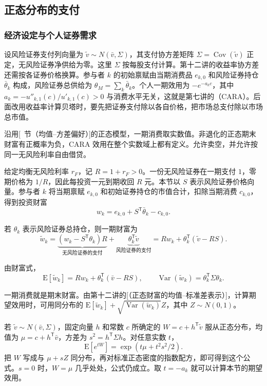 \subsection{正态分布的支付}
\subsubsection{经济设定与个人证券需求}
设风险证券支付列向量为 $\widetilde v\sim N(\bar v,\Sigma)$，其支付协方差矩阵 $\Sigma=\operatorname{Cov}(\widetilde v)$ 正定，无风险证券净供给为零。这里 $\Sigma$ 按每股支付计算。第十二讲的收益率协方差还需按各证券价格换算。参与者 $k$ 的初始禀赋由当期消费品 $e_{k,0}$ 和风险证券持仓 $\bar\theta_k$ 构成，风险证券总供给为 $\theta_M=\sum_k\bar\theta_k$。个人一期效用为 $-e^{-a_kc}$，其中 $a_k=-u''_{k,1}(c)/u'_{k,1}(c)>0$ 与消费水平无关，这就是第七讲的\mbox{}（CARA）。后面改用收益率计算贝塔时，要先把证券支付除以各自价格，把市场总支付除以市场总市值。

沿用[~节（均值--方差偏好）]的正态模型，一期消费取实数值。非退化的正态期末财富有正概率为负，CARA 效用在整个实数域上都有定义。允许卖空，并允许按同一无风险利率自由借贷。

给定均衡无风险利率 $r_F$，记 $R=1+r_F>0$。一份无风险证券在一期支付 $1$，零期价格为 $1/R$，因此每投资一元到期收回 $R$ 元。本节以 $S$ 表示风险证券价格向量。参与者 $k$ 将当期禀赋 $e_{k,0}$ 和初始证券持仓的市值合计，扣除当期消费 $c_{k,0}$，得到投资财富
\[
 w_k=e_{k,0}+S^{\mathsf T}\bar\theta_k-c_{k,0}.
\]

若 $\theta_k$ 表示风险证券总持仓，则一期财富为
\[
 \widetilde w_k=\underbrace{(w_k-S^{\mathsf T}\theta_k)R}_{\text{无风险证券的支付}}
 +\underbrace{\theta_k^{\mathsf T}\widetilde v}_{\text{风险证券的支付}}
 =Rw_k+\theta_k^{\mathsf T}(\widetilde v-RS).
\]

由财富式，
\[
 \mathrm E[\widetilde w_k]=Rw_k+\theta_k^{\mathsf T}(\bar v-RS),\qquad
 \operatorname{Var}(\widetilde w_k)=\theta_k^{\mathsf T}\Sigma\theta_k.
\]

一期消费就是期末财富。由第十二讲的[（正态财富的均值--标准差表示）]，计算期望效用时，可用同分布的 $\mathrm E[\widetilde w_k]+\sqrt{\operatorname{Var}(\widetilde w_k)}Z$，其中 $Z\sim N(0,1)$。

\begin{tcolorbox}[knowledge,title={联合正态的线性组合与正态指数矩}]
若 $\widetilde v\sim N(\bar v,\Sigma)$，固定向量 $h$ 和常数 $c$ 所确定的 $W=c+h^{\mathsf T}\widetilde v$ 服从正态分布，均值为 $\mu=c+h^{\mathsf T}\bar v$，方差为 $s^2=h^{\mathsf T}\Sigma h$。对任意实数 $t$，
\[
 \mathrm E[e^{tW}]=\exp(t\mu+t^2s^2/2).
\]
把 $W$ 写成与 $\mu+sZ$ 同分布，再对标准正态密度的指数配方，即可得到这个公式。$s=0$ 时，$W=\mu$ 几乎处处，公式仍成立。取 $t=-a_k$ 就可以计算本节的期望效用。
\end{tcolorbox}


